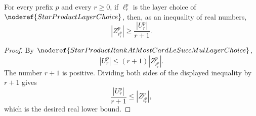 \begin{lemma}
For every prefix \(p\) and every \(r\ge0\), if
\(\ell_r^p\) is the layer choice of \(\noderef{StarProductLayerChoice}\),
then, as an inequality of real numbers,
\[
  |Z_{\ell_r^p}^p|\ge \frac{|U_r^p|}{r+1}.
\]
\end{lemma}
\begin{proof}
By \(\noderef{StarProductRankAtMostCardLeSuccMulLayerChoice}\),
\[
  |U_r^p|\le (r+1)|Z_{\ell_r^p}^p|.
\]
The number \(r+1\) is positive.  Dividing both sides of the displayed
inequality by \(r+1\) gives
\[
  \frac{|U_r^p|}{r+1}\le |Z_{\ell_r^p}^p|,
\]
which is the desired real lower bound.
\end{proof}

